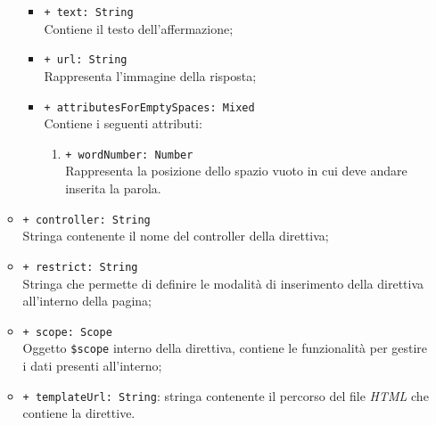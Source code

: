 \begin{itemize}
\begin{itemize}
\begin{itemize}
					\item \texttt{+ text: String} \\ Contiene il testo dell'affermazione;
					\item \texttt{+ url: String} \\ Rappresenta l'immagine della risposta;
					\item \texttt{+ attributesForEmptySpaces: Mixed} \\ Contiene i seguenti attributi:
					\begin{enumerate}
						\item \texttt{+ wordNumber: Number} \\ Rappresenta la posizione dello spazio vuoto in cui deve andare inserita la parola.
					\end{enumerate}
				\end{itemize}
				\item \texttt{+ controller: String} \\ Stringa contenente il nome del controller della direttiva;
				\item \texttt{+ restrict: String} \\ Stringa che permette di definire le modalità di inserimento della direttiva all'interno della pagina;
				\item \texttt{+ scope: Scope} \\Oggetto \texttt{\$scope} interno della direttiva, contiene le funzionalità per gestire i dati presenti all'interno;
				\item \texttt{+ templateUrl: String}: stringa contenente il percorso del file \textit{HTML} che contiene la direttive.
			\end{itemize}
		\end{itemize}